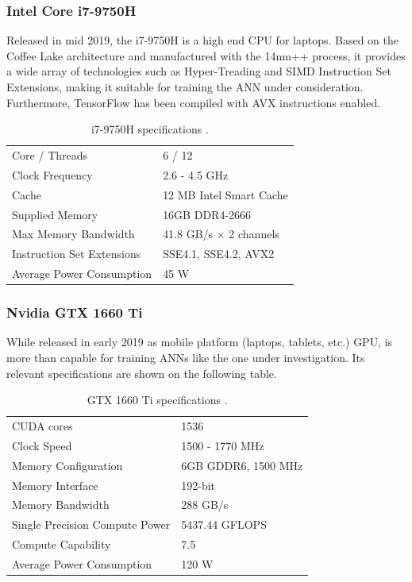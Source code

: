 \subsubsection{Intel Core i7-9750H}
Released in mid 2019, the i7-9750H is a high end CPU for laptops. Based on the Coffee Lake architecture and manufactured with the 14nm++ process, it provides a wide array of technologies such as Hyper-Treading and SIMD Instruction Set Extensions, making it suitable for training the ANN under consideration. Furthermore, TensorFlow has been compiled with AVX instructions enabled. %
\begin{table}[H]
    \center
    \begin{tabular}
        { l | l }
        Core / Threads & 6 / 12\\
        Clock Frequency & 2.6 - 4.5 GHz\\
        Cache & 12 MB Intel Smart Cache\\
        Supplied Memory & 16GB DDR4-2666\\
        Max Memory Bandwidth & 41.8 GB/s $\times$ 2 channels\\
        Instruction Set Extensions & SSE4.1, SSE4.2, AVX2\\
        Average Power Consumption & 45 W\\
    \end{tabular}
    \caption[i7-9750H specifications]{i7-9750H specifications \cite{i7-9750H}.}
    \label{table: i7-9750H}
\end{table}

\subsubsection{Nvidia GTX 1660 Ti}
While released in early 2019 as mobile platform (laptops, tablets, etc.) GPU, is more than capable for training ANNs like the one under investigation. Its relevant specifications are shown on the following table. %
\begin{table}[H]
    \center
    \begin{tabular}
        { l | l }
        CUDA cores & 1536\\
        Clock Speed & 1500 - 1770 MHz\\
        Memory Configuration & 6GB GDDR6, 1500 MHz\\
        Memory Interface & 192-bit\\
        Memory Bandwidth & 288 GB/s\\
        Single Precision Compute Power & 5437.44 GFLOPS\\
        Compute Capability & 7.5\\
        Average Power Consumption & 120 W\\
    \end{tabular}
    \caption[GTX 1660 Ti specifications]{GTX 1660 Ti specifications \cite{GTX1660Ti}.}
    \label{table: GTX1660Ti}
\end{table}

